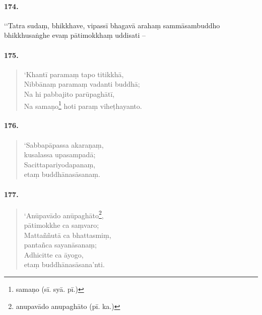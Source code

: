 \paragraph{174.} ‘‘Tatra sudaṃ, bhikkhave, vipassī bhagavā arahaṃ sammāsambuddho bhikkhusaṅghe evaṃ pātimokkhaṃ uddisati –

\paragraph{175.}\begin{verse}
  ‘Khantī paramaṃ tapo titikkhā,\\
  Nibbānaṃ paramaṃ vadanti buddhā;\\
  Na hi pabbajito parūpaghātī,\\
  Na samaṇo\footnote{samaṇo (sī. syā. pī.)} hoti paraṃ viheṭhayanto.\\
\end{verse}

\paragraph{176.}\begin{verse}
  ‘Sabbapāpassa akaraṇaṃ, \\kusalassa upasampadā;\\
  Sacittapariyodapanaṃ, \\etaṃ buddhānasāsanaṃ.
\end{verse}

\paragraph{177.}\begin{verse}
  ‘Anūpavādo anūpaghāto\footnote{anupavādo anupaghāto (pī. ka.)}, \\pātimokkhe ca saṃvaro;\\
  Mattaññutā ca bhattasmiṃ, \\pantañca sayanāsanaṃ;\\
  Adhicitte ca āyogo, \\etaṃ buddhānasāsana’nti.
\end{verse}



